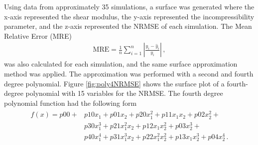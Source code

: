 Using data from approximately \SI{35}{} simulations, a surface was generated where the x-axis represented the shear 
modulus, the y-axis represented the incompressibility parameter, and the z-axis represented the NRMSE 
of each simulation. The Mean Relative Error (MRE) 
\begin{align}
	\text{MRE} = \frac{1}{n} \sum_{i=1}^{n} \left| \frac{y_i - \hat{y}_i}{y_i} \right| \, ,
    \label{eq:mre}
\end{align}
was also calculated for each simulation, and the same surface approximation method was applied. 
The approximation was performed with a second and fourth degree polynomial.
Figure \ref{fig:poly4NRMSE}
shows the surface plot of a fourth-degree polynomial with \SI{15}{} variables for the NRMSE. 
The fourth degree polynomial function had the following form
\begin{align}
	\begin{split}
	f(x) = p00 + &p10x_1 + p01x_2 + p20x_1^2 + p11x_1x_2 + p02x_2^2 + \\
	&p30x_1^3 + p21x_1^2x_2 + p12x_1x_2^2 + p03x_2^3 + \\
	&p40x_1^4 + p31x_1^3x_2 + p22x_1^2x_2^2 + p13x_1x_2^3 + p04x_2^4 \,.
	\end{split}
\end{align}
